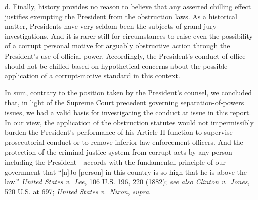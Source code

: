 d. Finally, history provides no reason to believe that any asserted chilling effect justifies exempting the President from the obstruction laws.
As a historical matter, Presidents have very seldom been the subjects of grand jury investigations.
And it is rarer still for circumstances to raise even the possibility of a corrupt personal motive for arguably obstructive action through the President’s use of official power.
Accordingly, the President’s conduct of office should not be chilled based on hypothetical concerns about the possible application of a corrupt-motive standard in this context.

\hr

In sum, contrary to the position taken by the President’s counsel, we concluded that, in light of the Supreme Court precedent governing separation-of-powers issues, we had a valid basis for investigating the conduct at issue in this report.
In our view, the application of the obstruction statutes would not impermissibly burden the President’s performance of his Article II function to supervise prosecutorial conduct or to remove inferior law-enforcement officers.
And the protection of the criminal justice system from corrupt acts by any person - including the President - accords with the fundamental principle of our government that “[n]Jo [person] in this country is so high that he is above the law.”
\textit{United States v.\ Lee}, 106 U.S. 196, 220 (1882);
\textit{see also Clinton v.\ Jones}, 520 U.S. at 697;
\textit{United States v.\ Nixon}, \textit{supra}.
